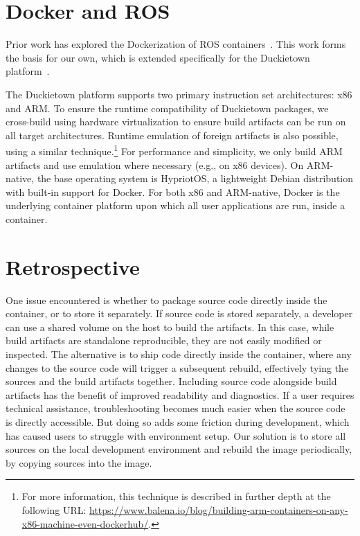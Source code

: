 \documentclass[12pt,initial,twoside,maitrise]{dms}
\numberwithin{equation}{section}
\numberwithin{table}{chapter}
\numberwithin{figure}{chapter}
\begin{document}
\section{Docker and ROS}

Prior work has explored the Dockerization of ROS containers~\cite{white2017ros-docker}. This work forms the basis for our own, which is extended specifically for the Duckietown platform~\cite{paull2017duckietown}.

The Duckietown platform supports two primary instruction set architectures: x86 and ARM. To ensure the runtime compatibility of Duckietown packages, we cross-build using hardware virtualization to ensure build artifacts can be run on all target architectures. Runtime emulation of foreign artifacts is also possible, using a similar technique.\footnote{For more information, this technique is described in further depth at the following URL: \url{https://www.balena.io/blog/building-arm-containers-on-any-x86-machine-even-dockerhub/}.} For performance and simplicity, we only build ARM artifacts and use emulation where necessary (e.g., on x86 devices). On ARM-native, the base operating system is HypriotOS, a lightweight Debian distribution with built-in support for Docker. For both x86 and ARM-native, Docker is the underlying container platform upon which all user applications are run, inside a container.

\section{Retrospective}

One issue encountered is whether to package source code directly inside the container, or to store it separately. If source code is stored separately, a developer can use a shared volume on the host to build the artifacts. In this case, while build artifacts are standalone reproducible, they are not easily modified or inspected. The alternative is to ship code directly inside the container, where any changes to the source code will trigger a subsequent rebuild, effectively tying the sources and the build artifacts together. Including source code alongside build artifacts has the benefit of improved readability and diagnostics. If a user requires technical assistance, troubleshooting becomes much easier when the source code is directly accessible. But doing so adds some friction during development, which has caused users to struggle with environment setup. Our solution is to store all sources on the local development environment and rebuild the image periodically, by copying sources into the image.
\end{document}
